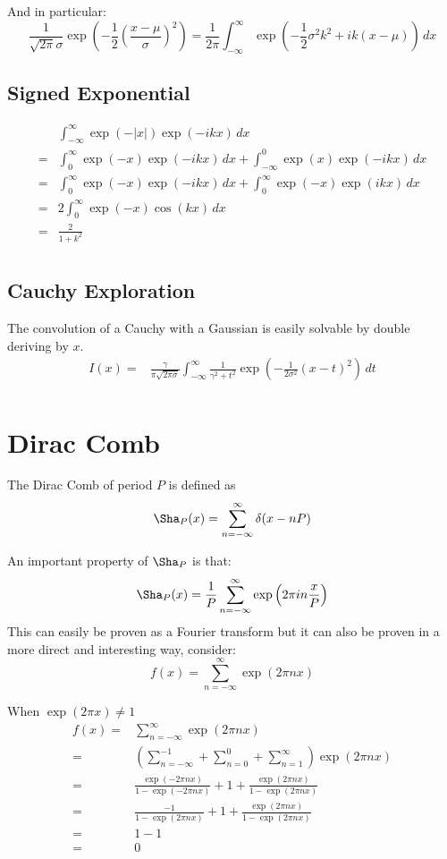 And in particular:
\[ \frac{1}{\sqrt{2\pi}\sigma} \exp\left(-\frac{1}{2}\left(\frac{x-\mu}{\sigma}\right)^2\right) = \frac{1}{2\pi}\int_{-\infty}^{\infty}\exp\left(-\frac{1}{2}\sigma^2k^2+ik(x-\mu)\right) \,dx \] 
\subsection{Signed Exponential}
\begin{equation*}
\begin{aligned}
&\int_{-\infty}^{\infty}\exp(-|x|)\exp(-ikx)\,dx \\
=& \int_{0}^{\infty}\exp(-x)\exp(-ikx)\,dx+\int_{-\infty}^{0}\exp(x)\exp(-ikx)\,dx\\
=& \int_{0}^{\infty}\exp(-x)\exp(-ikx)\,dx+\int^{\infty}_{0}\exp(-x)\exp(ikx)\,dx\\
=& 2\int_{0}^{\infty}\exp(-x)\cos(kx)\,dx\\
=& \frac{2}{1+k^2}\\
\end{aligned}
\end{equation*}
\subsection{Cauchy Exploration}
The convolution of a Cauchy with a Gaussian is easily solvable by double deriving by $x$.
\begin{equation*}
\begin{aligned}
I(x) =&\frac{\gamma}{\pi\sqrt{2\pi\sigma}}\int_{-\infty}^{\infty}\frac{1}{\gamma^2+t^2}\exp\left(-\frac{1}{2\sigma^2}(x-t)^2\right)\,dt\\
\end{aligned}
\end{equation*}

\section{Dirac Comb}
\label{appx:dirac-comb}
The Dirac Comb of period $P$ is defined as
\[\Sha_P(x) = \sum_{n=-\infty}^{\infty}\delta(x-nP) \] 

An important property of $\Sha_P$ is that:
\[\Sha_P(x) = \frac{1}{P}\sum_{n=-\infty}^{\infty}\exp\left(2\pi i n \frac{x}{P}\right)\]
This can easily be proven as a Fourier transform but it can also be proven in a more direct and interesting way, consider:
\[f(x) = \sum_{n=-\infty}^{\infty}\exp(2\pi n x)\]

When $\exp(2\pi x) \neq 1$
\begin{equation*}
\begin{aligned}
f(x) =& \sum_{n=-\infty}^{\infty}\exp(2\pi n x) \\
=& \left(\sum_{n=-\infty}^{-1}+\sum_{n=0}^{0}+\sum_{n=1}^{\infty}\right)\exp(2\pi n x) \\
=& \frac{\exp(-2\pi n x)}{1-\exp(-2\pi n x)} + 1 + \frac{\exp(2\pi n x)}{1-\exp(2\pi n x)} \\
=& \frac{-1}{1-\exp(2\pi n x)} + 1 + \frac{\exp(2\pi n x)}{1-\exp(2\pi n x)} \\
=& 1-1\\
=& 0\\
\end{aligned}
\end{equation*}

